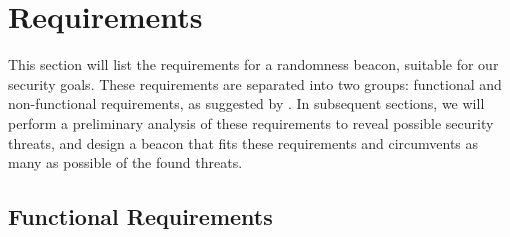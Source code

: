 \section{Requirements}
\label{sec:beacon_requirements}

This section will list the requirements for a randomness beacon, suitable for our security goals.
These requirements are separated into two groups: functional and non-functional requirements, as suggested by \citet[sec.\ 1.4.1]{swebok}.
In subsequent sections, we will perform a preliminary analysis of these requirements to reveal possible security threats, and design a beacon that fits these requirements and circumvents as many as possible of the found threats.

\subsection{Functional Requirements}
\label{sub:functional_requirements}
